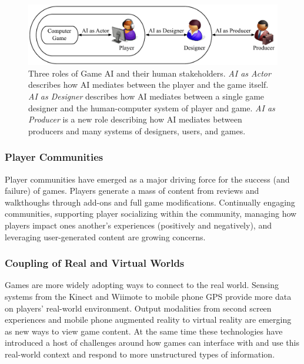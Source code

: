 \documentclass[conference]{IEEEtran}
\begin{document}
\begin{figure}
\centering
\includegraphics[scale=0.7]{metaphor.pdf}
\caption{Three roles of Game AI and their human stakeholders.
{\em AI as Actor} describes how AI mediates between the player and the game itself. 
{\em AI as Designer} describes how AI mediates between a single game designer and the human-computer system of player and game. 
{\em AI as Producer} is a new role describing how AI mediates between producers and many systems of designers, users, and games.
}
\label{fig:metaphor}
\end{figure}

\subsubsection{Player Communities}
Player communities have emerged as a major driving force for the success (and failure) of games. 
Players generate a mass of content from reviews and walkthoughs through add-ons and full game modifications.
Continually engaging communities, supporting player socializing within the community, managing how players impact ones another's experiences (positively and negatively), and leveraging user-generated content are growing concerns.


\subsubsection{Coupling of Real and Virtual Worlds}
Games are more widely adopting ways to connect to the real world. 
Sensing systems from the Kinect and Wiimote to mobile phone GPS provide more data on players' real-world environment. 
Output modalities from second screen experiences and mobile phone augmented reality to virtual reality are emerging as new ways to view game content. 
At the same time these technologies have introduced a host of challenges around how games can interface with and use this real-world context and respond to more unstructured types of information.
\end{document}

